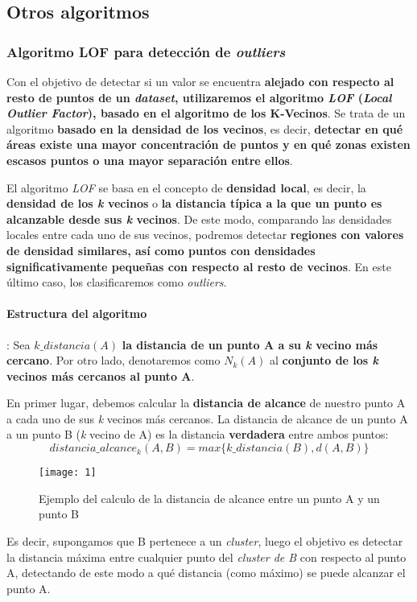 \documentclass [a4paper] {article}
\begin{document}
\newpage
\subsection{Otros algoritmos}
\subsubsection{Algoritmo LOF para detección de \textit{outliers}}
Con el objetivo de detectar si un valor se encuentra \textbf{alejado con respecto al resto de puntos de un \textit{dataset}, utilizaremos el algoritmo \textit{LOF} (\textit{Local Outlier Factor}), basado en el algoritmo de los K-Vecinos}. Se trata de un algoritmo \textbf{basado en la densidad de los vecinos}, es decir, \textbf{detectar en qué áreas existe una mayor concentración de puntos y en qué zonas existen escasos puntos o una mayor separación entre ellos}.

El algoritmo \textit{LOF} se basa en el concepto de \textbf{densidad local}, es decir, la \textbf{densidad de los \textit{k} vecinos} o \textbf{la distancia típica a la que un punto es alcanzable desde sus \textit{k} vecinos}. De este modo, comparando las densidades locales entre cada uno de sus vecinos, podremos detectar \textbf{regiones con valores de densidad similares, así como puntos con densidades significativamente pequeñas con respecto al resto de vecinos}. En este último caso, los clasificaremos como \textit{outliers}.

\paragraph{Estructura del algoritmo}:
Sea $k\_distancia(A)$ \textbf{la distancia de un punto A a su \textit{k} vecino más cercano}. Por otro lado, denotaremos como $N_{k}(A)$ al \textbf{conjunto de los \textit{k} vecinos más cercanos al punto A}.

En primer lugar, debemos calcular la \textbf{distancia de alcance} de nuestro punto A a cada uno de sus \textit{k} vecinos más cercanos.
La distancia de alcance de un punto A a un punto B (\textit{k} vecino de A) es la distancia \textbf{verdadera} entre ambos puntos:
\begin{equation*}
distancia\_alcance_{k}(A,B) = max\{k\_distancia(B), d(A,B)\}
\end{equation*}

\begin{figure}[h!]
\centering
\texttt{[image: 1]}
\caption{Ejemplo del calculo de la distancia de alcance entre un punto A y un punto B}
\end{figure}
Es decir, supongamos que B pertenece a un \textit{cluster}, luego el objetivo es detectar la distancia máxima entre cualquier punto del \textit{cluster de B} con respecto al punto A, detectando de este modo a qué distancia (como máximo) se puede alcanzar el punto A.
\end{document}
